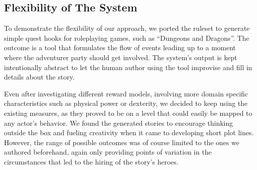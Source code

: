 \subsection{Flexibility of The System}
To demonstrate the flexibility of our approach, we ported the ruleset to generate simple quest hooks for roleplaying games, such as \enquote{Dungeons and Dragons}.
The outcome is a tool that formulates the flow of events leading up to a moment where the adventurer party should get involved.
The system's output is kept intentionally abstract to let the human author using the tool improvise and fill in details about the story.

Even after investigating different reward models, involving more domain specific characteristics such as physical power or dexterity, we decided to keep using the existing measures, as they proved to be on a level that could easily be mapped to any actor's behavior.
We found the generated stories to encourage thinking outside the box and fueling creativity when it came to developing short plot lines.
However, the range of possible outcomes was of course limited to the ones we authored beforehand, again only providing points of variation in the circumstances that led to the hiring of the story's heroes.
